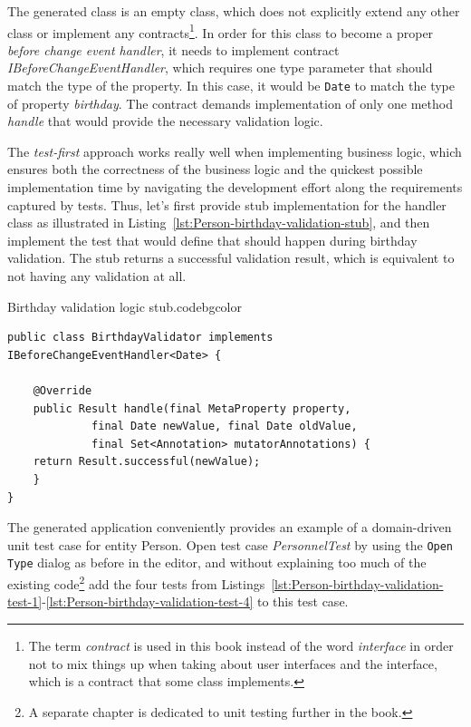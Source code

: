   The generated class is an empty class, which does not explicitly extend any other class or implement any contracts\footnote{The term \emph{contract} is used in this book instead of the word \emph{interface} in order not to mix things up when taking about user interfaces and the interface, which is a contract that some class implements.}.
  In order for this class to become a proper \emph{before change event handler}, it needs to implement contract \emph{IBeforeChangeEventHandler}, which requires one type parameter that should match the type of the property.
  In this case, it would be \texttt{Date} to match the type of property \emph{birthday}.
  The contract demands implementation of only one method \emph{handle} that would provide the necessary validation logic.
  
  The \emph{test-first} approach works really well when implementing business logic, which ensures both the correctness of the business logic and the quickest possible implementation time by navigating the development effort along the requirements captured by tests.
  Thus, let's first provide stub implementation for the handler class as illustrated in Listing~\ref{lst:Person-birthday-validation-stub}, and then implement the test that would define that should happen during birthday validation.  
  The stub returns a successful validation result, which is equivalent to not having any validation at all.
  
 \begin{code}{Birthday validation logic stub.}{\label{lst:Person-birthday-validation-stub}}{codebgcolor}
    \begin{lstlisting}
public class BirthdayValidator implements IBeforeChangeEventHandler<Date> {

    @Override
    public Result handle(final MetaProperty property, 
			 final Date newValue, final Date oldValue, 
			 final Set<Annotation> mutatorAnnotations) {
	return Result.successful(newValue);
    }
}
    \end{lstlisting}
  \end{code}
  
  The generated application conveniently provides an example of a domain-driven unit test case for entity Person.
  Open test case \emph{PersonnelTest} by using the \texttt{Open Type} dialog as before in the editor, and without explaining too much of the existing code\footnote{A separate chapter is dedicated to unit testing further in the book.} add the four tests from Listings~\ref{lst:Person-birthday-validation-test-1}-\ref{lst:Person-birthday-validation-test-4} to this test case.

